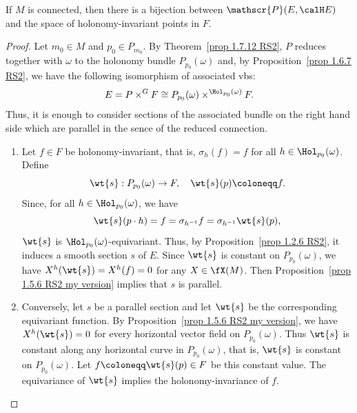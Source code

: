 \begin{prop}\label{prop 1.7.20 RS2 holonomy principle}
    If $M$ is connected, then there is a bijection between $\mathscr{P}(E,\calH E)$ and the space of holonomy-invariant points in $F$.
\end{prop}
\begin{proof}
    Let $m_0\in M$ and $p_0\in P_{m_0}$. By Theorem~\ref{prop 1.7.12 RS2}, $P$ reduces together with $\omega$ to the holonomy bundle $P_{p_0}(\omega)$ and, by Proposition~\ref{prop 1.6.7 RS2}, we have the following isomorphism of associated \glspl{vb}:
    \[E=P\times^G F\cong P_{p_0}(\omega)\times^{\Hol_{p_0}(\omega)}F.\]
    Thus, it is enough to consider sections of the associated bundle on the right hand side which are parallel in the sence of the reduced connection.
    \begin{enumerate}
        \item Let $f\in F$ be holonomy-invariant, that is, $\sigma_h(f)=f$ for all $h\in\Hol_{p_0}(\omega)$. Define
        \[\wt{s}:P_{p_0}(\omega)\to F,\quad \wt{s}(p)\coloneqq f.\]
        Since, for all $h\in \Hol_{p_0}(\omega)$, we have
        \[\wt{s}(p\cdot h)=f=\sigma_{h^{-1}}f=\sigma_{h^{-1}}\wt{s}(p),\]
        $\wt{s}$ is $\Hol_{p_0}(\omega)$-equivariant. Thus, by Proposition~\ref{prop 1.2.6 RS2}, it induces a smooth section $s$ of $E$. Since $\wt{s}$ is constant on $P_{p_0}(\omega)$, we have $X^h(\wt{s})=X^h(f)=0$ for any $X\in\fX(M)$. Then Proposition~\ref{prop 1.5.6 RS2 my version} implies that $s$ is parallel.
        \item Conversely, let $s$ be a parallel section and let $\wt{s}$ be the corresponding equivariant function. By Proposition~\ref{prop 1.5.6 RS2 my version}, we have $X^h(\wt{s})=0$ for every horizontal vector field on $P_{p_0}(\omega)$. Thus $\wt{s}$ is constant along any horizontal curve in $P_{p_0}(\omega)$, that is, $\wt{s}$ is constant on $P_{p_0}(\omega)$. Let $f\coloneqq \wt{s}(p)\in F$ be this constant value. The equivariance of $\wt{s}$ implies the holonomy-invariance of $f$.
    \end{enumerate}
\end{proof}





